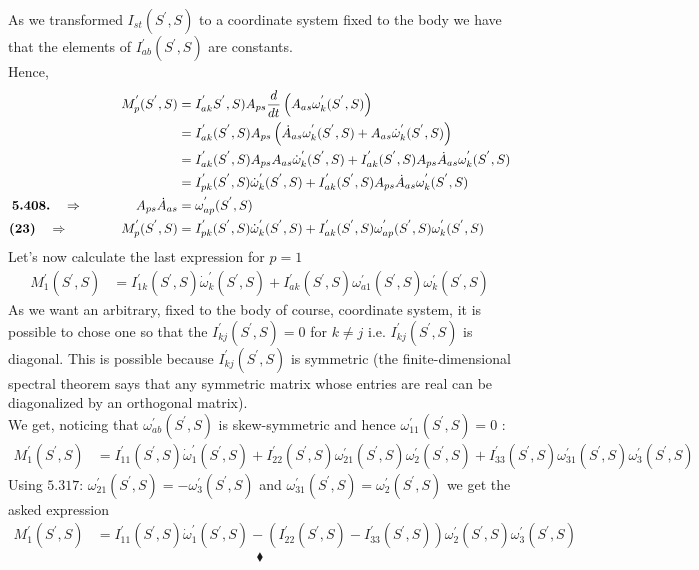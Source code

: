 As we transformed $I_{st}(S^{'},S)$ to a coordinate system fixed to the body we have that the elements of $I^{'}_{ab}(S^{'},S)$ are constants.\\
Hence,
\begin{align}
 M^{'}_p(S^{'},S) &=I^{'}_{ak}S^{'},S)A_{ps}\dv{}{t}\left( A_{as}\omega^{'}_{k}(S^{'},S)\right)\\
 &=I^{'}_{ak}(S^{'},S)A_{ps}\left(\dot{A}_{as}\omega^{'}_{k}(S^{'},S)+A_{as} \dot{\omega}^{'}_{k}(S^{'},S)\right)\\
 &=I^{'}_{ak}(S^{'},S)A_{ps}A_{as} \dot{\omega}^{'}_{k}(S^{'},S)+ I^{'}_{ak}(S^{'},S)A_{ps}\dot{A}_{as}\omega^{'}_{k}(S^{'},S)\\
 &=I^{'}_{pk}(S^{'},S) \dot{\omega}^{'}_{k}(S^{'},S)+ I^{'}_{ak}(S^{'},S)A_{ps}\dot{A}_{as}\omega^{'}_{k}(S^{'},S)\\
\textbf{5.408.}\quad\Rightarrow \quad\quad\quad\quad  A_{ps}\dot{A}_{as} &= \omega^{'}_{ap}(S^{'},S)\\
\textbf{(23)}\quad\Rightarrow \quad\quad\quad\quad  M^{'}_p(S^{'},S) &=I^{'}_{pk}(S^{'},S) \dot{\omega}^{'}_{k}(S^{'},S)+ I^{'}_{ak}(S^{'},S)\omega^{'}_{ap}(S^{'},S)\omega^{'}_{k}(S^{'},S)
\end{align}
Let's now calculate the last expression for $p=1$
\begin{align}
M^{'}_1(S^{'},S) &=I^{'}_{1k}(S^{'},S) \dot{\omega}^{'}_{k}(S^{'},S)+ I^{'}_{ak}(S^{'},S)\omega^{'}_{a1}(S^{'},S)\omega^{'}_{k}(S^{'},S)
\end{align}
As we want an arbitrary, fixed to the body of course, coordinate system, it is possible to chose one so that the $I^{'}_{kj}(S^{'},S) = 0 $ for $k\neq j$ i.e. $I^{'}_{kj}(S^{'},S) $ is diagonal. This is possible because $ I^{'}_{kj}(S^{'},S) $ is symmetric (the finite-dimensional spectral theorem says that any symmetric matrix whose entries are real can be diagonalized by an orthogonal matrix).\\
We get, noticing that $\omega^{'}_{ab}(S^{'},S)$ is skew-symmetric and hence $\omega^{'}_{11}(S^{'},S) = 0$ :
\begin{align}
M^{'}_1(S^{'},S) &= I^{'}_{11}(S^{'},S) \dot{\omega}^{'}_{1}(S^{'},S)+ I^{'}_{22}(S^{'},S)\omega^{'}_{21}(S^{'},S)\omega^{'}_{2}(S^{'},S)+ I^{'}_{33}(S^{'},S)\omega^{'}_{31}(S^{'},S)\omega^{'}_{3}(S^{'},S)
\end{align}
Using $\mathbf{5.317}$:  $\omega^{'}_{21}(S^{'},S)=-\omega^{'}_{3}(S^{'},S)$ and $\omega^{'}_{31}(S^{'},S)=\omega^{'}_{2}(S^{'},S)$  we get the asked expression 
\begin{align}
M^{'}_1(S^{'},S) &= I^{'}_{11}(S^{'},S) \dot{\omega}^{'}_{1}(S^{'},S)-\left( I^{'}_{22}(S^{'},S)- I^{'}_{33}(S^{'},S)\right)\omega^{'}_{2}(S^{'},S)\omega^{'}_{3}(S^{'},S)
\end{align}
$$\blacklozenge$$
\newpage
